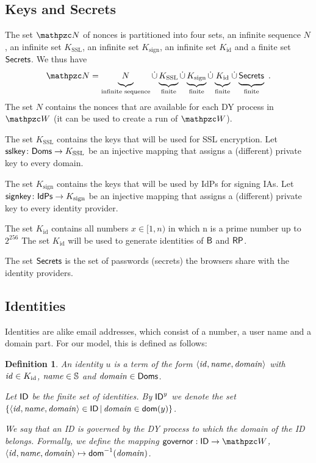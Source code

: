 \documentclass[letterpaper,onecolumn,10pt]{article}
\newtheorem{definition}{Definition}
\begin{document}
\subsection{Keys and Secrets} The set $\nonces$ of nonces is
partitioned into four sets, an infinite sequence $N$, an infinite set
$K_\text{SSL}$, an infinite set $K_\text{sign}$, an infinite set $K_\text{id}$ and a finite set
$\mathsf{Secrets}$. We thus have
\begin{align*}
\def\hereMaxHeightPhantom{\vphantom{K_{\text{p}}^\bidsystem}}
\nonces = 
\underbrace{N\hereMaxHeightPhantom}_{\text{infinite sequence}} 
\dot\cup \underbrace{K_{\text{SSL}}\hereMaxHeightPhantom}_{\text{finite}} 
\dot\cup \underbrace{K_{\text{sign}}\hereMaxHeightPhantom}_{\text{finite}}
\dot\cup \underbrace{K_{\text{id}}\hereMaxHeightPhantom}_{\text{finite}}  
\dot\cup \underbrace{\RPSecrets\hereMaxHeightPhantom}_{\text{finite}}\ .
\end{align*}
The set $N$ contains the nonces that are available for each DY process
in $\bidsystem$ (it can be used to create a run of $\bidsystem$). 

The set $K_\text{SSL}$ contains the keys that will be used for SSL
encryption. Let $\mathsf{sslkey}\colon \mathsf{Doms} \to K_\text{SSL}$ be an injective
mapping that assigns a (different) private key to every domain.

The set $K_\text{sign}$ contains the keys that will be used by IdPs
for signing IAs. Let $\mathsf{signkey}\colon \mathsf{IdPs} \to K_\text{sign}$
be an injective mapping that assigns a (different) private key to every identity
provider.

The set $K_\text{id}$ contains all numbers $x\in[1,n)$ in which n is a prime number up to $2^{256}$
The set $K_\text{id}$ will be used to generate identities of $\mathsf{B}$ and $\mathsf{RP}$.

The set $\mathsf{Secrets}$ is the
set of passwords (secrets) the browsers share with the identity
providers. 

\subsection{Identities}\label{app:uppresso-identities}
Identities are alike email addresses, which consist of a number, a user name 
and a domain part. For our model, this is defined as follows:
\begin{definition}
  An \emph{identity} $u$ is a term of the form $\langle\mathit{id},\mathit{name},\mathit{domain}\rangle$ 
  with $\mathit{id}\in K_\text{id}$, $\mathit{name}\in \mathbb{S}$ and $\mathit{domain} \in \mathsf{Doms}$.

  Let $\mathsf{ID}$ be the finite set of identities. By $\mathsf{ID}^y$ we denote
  the set $\{ \langle\mathit{id},\mathit{name},\mathit{domain}\rangle \in \mathsf{ID}\,|\, \mathit{domain}
  \in \mathsf{dom}(y) \}$.

  We say that an ID is \emph{governed} by the DY process to which the
  domain of the ID belongs. Formally, we define the mapping $\mapGovernor:
  \IDs \to \bidsystem$, $\langle\mathit{id},\mathit{name},\mathit{domain}\rangle \mapsto
  \mathsf{dom}^{-1}(\mathit{domain})$.
\end{definition}
\end{document}
